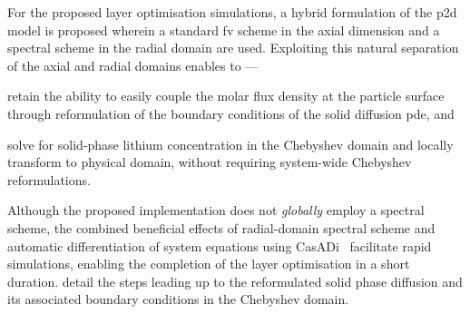     For the proposed layer optimisation simulations, a hybrid formulation of the
    \gls{p2d} model is proposed wherein a  standard \gls{fv} scheme in the axial
    dimension and  a spectral scheme in  the radial domain are  used. Exploiting
    this natural separation of the axial and radial domains enables to ---
    \begin{enumerate*}[label=\roman*)]
        \item retain  the   ability  to  easily   couple  the   molar  flux  density   at  the particle  surface  through  reformulation  of the  boundary  conditions  of  the solid  diffusion \gls{pde},  and
        \item solve  for  solid-phase  lithium  concentration  in  the  Chebyshev  domain  and locally transform  to physical  domain, without requiring  system-wide Chebyshev reformulations.
    \end{enumerate*}
    Although  the  proposed  implementation   does  not  \emph{globally}  employ
    a  spectral  scheme,  the   combined  beneficial  effects  of  radial-domain
    spectral   scheme  and   automatic  differentiation   of  system   equations
    using  CasADi~\cite{Andersson2013b} facilitate  rapid simulations,  enabling
    the   completion  of   the   layer  optimisation   in   a  short   duration.
      detail  the  steps
    leading  up to  the reformulated  solid phase  diffusion and  its associated
    boundary conditions in the Chebyshev domain.

